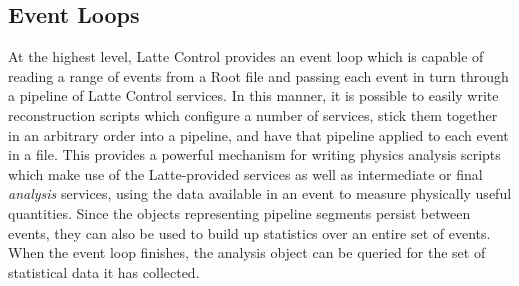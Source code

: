 \subsection{Event Loops}
At the highest level, Latte Control provides an event loop which is capable of reading a range of events from a {\sc Root} file and passing each event in turn through a pipeline of Latte Control services. In this manner, it is possible to easily write reconstruction scripts which configure a number of services, stick them together in an arbitrary order into a pipeline, and have that pipeline applied to each event in a file. This provides a powerful mechanism for writing physics analysis scripts which make use of the Latte-provided services as well as intermediate or final \emph{analysis} services, using the data available in an event to measure physically useful quantities. Since the objects representing pipeline segments persist between events, they can also be used to build up statistics over an entire set of events. When the event loop finishes, the analysis object can be queried for the set of statistical data it has collected.

